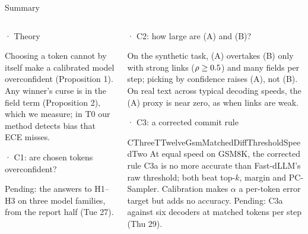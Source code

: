 \documentclass[aspectratio=169,10pt,t]{beamer}
\newcommand{\A}{{\color{dep}\firasemibold (A)}\xspace}
\newcommand{\B}{{\color{est}\firasemibold (B)}\xspace}
\newcommand{\paneltitle}[1]{{\color{accentdark}\small\firasemibold #1}\par\vspace{0.8mm}}
\newif\ifCOneMacros
\begin{document}
\begin{frame}{Summary}
  \vspace{2mm}
  \begin{columns}[T,onlytextwidth]
    \begin{column}{0.485\textwidth}
      \begin{panel}[height=26mm]
        \paneltitle{1 · Theory}
        Choosing a token cannot by itself make a calibrated model overconfident
        (Proposition 1). Any winner's curse is in the field term (Proposition 2), which we
        measure; in T0 our method detects bias that ECE misses.
      \end{panel}
      \vspace{1.5mm}
      \begin{panel}[height=26mm, colback=wash, colframe=accent!40]
        \paneltitle{2 · C1: are chosen tokens overconfident?}
        \ifCOneMacros
          With a decoder choosing, overconfidence grows with the contest in every model;
          the winner's-curse component is clear in instruct models. Committed tokens show
          substantially higher overconfidence than standard ECE.
        \else
          {\color{ink2}Pending: the answers to H1–H3 on three model families, from the
          report half (Tue 27).}
        \fi
      \end{panel}
    \end{column}
    \begin{column}{0.485\textwidth}
      \begin{panel}[height=26mm]
        \paneltitle{3 · C2: how large are (A) and (B)?}
        On the synthetic task, \A overtakes \B only with strong links ($\rho \ge 0.5$)
        and many fields per step; picking by confidence raises \A, not \B. On real text across
        typical decoding speeds, the \A proxy is near zero, as when links are weak.
      \end{panel}
      \vspace{1.5mm}
      \begin{panel}[height=26mm, colback=wash, colframe=accent!40]
        \paneltitle{4 · C3: a corrected commit rule}
        \ifcsname CThreeTTwelveGsmMatchedDiffThresholdSpeedTwo\endcsname
          At equal speed on GSM8K, the corrected rule C3a is no more accurate than Fast-dLLM's
          raw threshold; both beat top-$k$, margin and PC-Sampler. Calibration makes $\alpha$ a per-token error target but adds no accuracy.
        \else
          {\color{ink2}Pending: C3a against six decoders at matched tokens per step
          (Thu 29).}
        \fi
      \end{panel}
    \end{column}
  \end{columns}
\end{frame}
\end{document}
